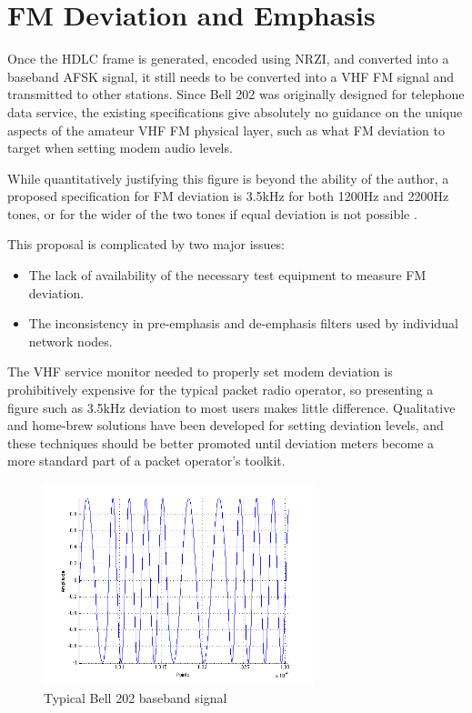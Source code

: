 \documentclass[12pt,letterpaper]{article}
\begin{document}
\section{FM Deviation and Emphasis}

Once the HDLC frame is generated, encoded using NRZI, and converted into
a baseband AFSK signal, it still needs to be converted into a VHF FM signal
and transmitted to other stations. 
Since Bell 202 was originally designed for telephone data service, 
the existing specifications give absolutely no guidance on the unique 
aspects of the amateur VHF FM physical layer, such as what 
FM deviation to target when setting modem audio levels.

While quantitatively justifying this figure is beyond the ability of the
author, a proposed specification for FM deviation is 3.5kHz for both
1200Hz and 2200Hz tones, or for the wider of the two tones if equal
deviation is not possible \cite{millerinterview}.

This proposal is complicated by two major issues: 
\begin{itemize}
	\item The lack of availability of the necessary 
		test equipment to measure FM deviation.
	\item The inconsistency in pre-emphasis and de-emphasis filters
		used by individual network nodes.
\end{itemize}

The VHF service monitor needed to properly set modem deviation is prohibitively
expensive for the typical packet radio operator, so presenting a figure 
such as 3.5kHz deviation to most users makes little difference.
Qualitative and home-brew solutions have been developed
for setting deviation levels\cite{n8urdev},
and these techniques should be better promoted until 
deviation meters become a more standard part of a packet operator's toolkit. 

\begin{figure}
	\centering
	\includegraphics[width=0.7\textwidth]{src/bell202sample}
	\caption{Typical Bell 202 baseband signal}
	\label{fig:bell202sample}
\end{figure}
\end{document}
